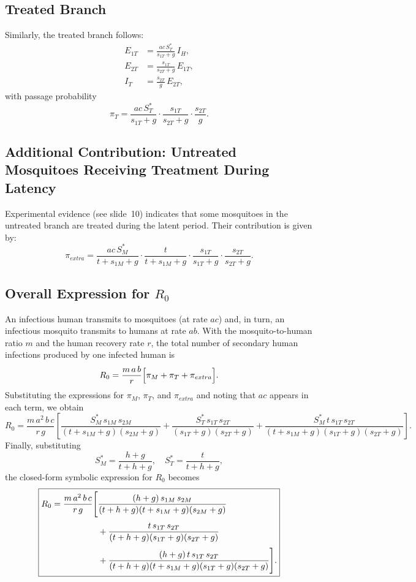 \documentclass{article}
\begin{document}
\subsection*{Treated Branch}
Similarly, the treated branch follows:
\[
\begin{aligned}
E_{1T}&=\frac{ac\,S_T^*}{s_{1T}+g}\,I_H,\\[1mm]
E_{2T}&=\frac{s_{1T}}{s_{2T}+g}\,E_{1T},\\[1mm]
I_T&=\frac{s_{2T}}{g}\,E_{2T},
\end{aligned}
\]
with passage probability
\[
\pi_T=\frac{ac\,S_T^*}{s_{1T}+g}\cdot\frac{s_{1T}}{s_{2T}+g}\cdot\frac{s_{2T}}{g}.
\]

\subsection*{Additional Contribution: Untreated Mosquitoes Receiving Treatment During Latency}
Experimental evidence (see slide~10) indicates that some mosquitoes in the untreated branch are treated during the latent period. Their contribution is given by:
\[
\pi_{extra}=\frac{ac\,S_M^*}{t+s_{1M}+g}\cdot\frac{t}{t+s_{1M}+g}\cdot\frac{s_{1T}}{s_{1T}+g}\cdot\frac{s_{2T}}{s_{2T}+g}.
\]

\subsection*{Overall Expression for \(R_0\)}
An infectious human transmits to mosquitoes (at rate \(ac\)) and, in turn, an infectious mosquito transmits to humans at rate \(ab\). With the mosquito-to-human ratio \(m\) and the human recovery rate \(r\), the total number of secondary human infections produced by one infected human is
\[
R_0=\frac{m\,a\,b}{r}\Bigl[\pi_M+\pi_T+\pi_{extra}\Bigr].
\]
Substituting the expressions for \(\pi_M\), \(\pi_T\), and \(\pi_{extra}\) and noting that \(ac\) appears in each term, we obtain
\[
R_0=\frac{m\,a^2\,b\,c}{r\,g}\left[\frac{S_M^*\,s_{1M}\,s_{2M}}{(t+s_{1M}+g)(s_{2M}+g)}
+\frac{S_T^*\,s_{1T}\,s_{2T}}{(s_{1T}+g)(s_{2T}+g)}
+\frac{S_M^*\,t\,s_{1T}\,s_{2T}}{(t+s_{1M}+g)(s_{1T}+g)(s_{2T}+g)}
\right].
\]
Finally, substituting
\[
S_M^*=\frac{h+g}{t+h+g},\quad S_T^*=\frac{t}{t+h+g},
\]
the closed-form symbolic expression for \(R_0\) becomes
\begin{equation}
    \boxed{%
    \begin{aligned}
    R_0=\frac{m\,a^2\,b\,c}{r\,g}\Biggl[&\frac{(h+g)\,s_{1M}\,s_{2M}}{(t+h+g)(t+s_{1M}+g)(s_{2M}+g)}\\[1mm]
    &+\frac{t\,s_{1T}\,s_{2T}}{(t+h+g)(s_{1T}+g)(s_{2T}+g)}\\[1mm]
    &+\frac{(h+g)\,t\,s_{1T}\,s_{2T}}{(t+h+g)(t+s_{1M}+g)(s_{1T}+g)(s_{2T}+g)}
    \Biggr].
    \end{aligned}
    }
\end{equation}
    
\end{document}

